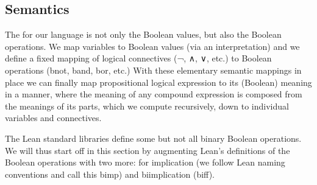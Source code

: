 \documentclass[letterpaper,10pt,english]{sphinxmanual}
\begin{document}
\subsection{Semantics}
\label{\detokenize{A_01_Propositional_Logic:id7}}
\sphinxAtStartPar
The  for our language is not only the
Boolean values, but also the Boolean operations. We map
variables to Boolean values (via an interpretation) and
we define a fixed mapping of logical connectives (¬, ∧,
∨, etc.) to Boolean operations (bnot, band, bor, etc.)
With these elementary semantic mappings in place we can
finally map  propositional logical expression to
its (Boolean) meaning in a  manner, where
the meaning of any compound expression is composed from
the meanings of its parts, which we compute recursively,
down to individual variables and connectives.

\sphinxAtStartPar
The Lean standard libraries define some but not all
binary Boolean operations. We will thus start off in
this section by augmenting Lean’s definitions of the
Boolean operations with two more: for implication (we
follow Lean naming conventions and call this bimp) and
bi\sphinxhyphen{}implication (biff).

\begin{sphinxVerbatim}[commandchars=\\\{\}]
       
    
    
    
    

       
    
    
    
    
\end{sphinxVerbatim}
\end{document}
